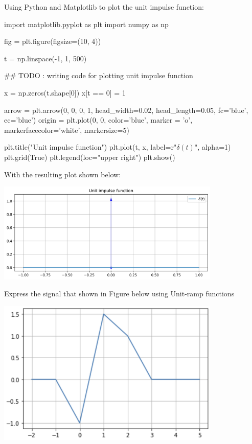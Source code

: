 \documentclass[a4paper, 10pt]{article}
\begin{document}
\begin{solution}
Using Python and Matplotlib to plot the unit impulse function:
\begin{codingbox}
import matplotlib.pyplot as plt
import numpy as np

fig = plt.figure(figsize=(10, 4))

t = np.linspace(-1, 1, 500)

## TODO : writing code for plotting unit impulse function

x = np.zeros(t.shape[0])
x[t == 0] = 1

arrow = plt.arrow(0, 0, 0, 1, head_width=0.02, head_length=0.05, fc='blue', ec='blue')
origin = plt.plot(0, 0, color='blue', marker = 'o', markerfacecolor='white', markersize=5)

plt.title("Unit impulse function")
plt.plot(t, x, label=r"$\delta(t)$", alpha=1)
plt.grid(True)
plt.legend(loc="upper right")
plt.show()
\end{codingbox}

With the resulting plot shown below:
\begin{center}
    \includegraphics[width=0.8\textwidth]{images/problem_7_2.png}
\end{center}
\end{solution}

\newpage

\begin{problem}
Express the signal that shown in Figure below using Unit-ramp functions

\begin{center}
    \includegraphics[width=0.8\textwidth]{images/problem_8_reference.png}
\end{center}
\end{problem}
\end{document}
